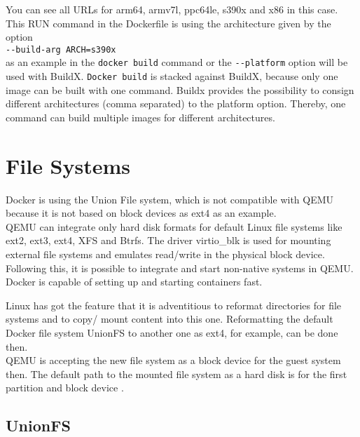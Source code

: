You can see all URLs for arm64, armv7l, ppc64le, s390x and x86 in this case. This RUN command in the Dockerfile is using the architecture given by the option \\
\lstinline!--build-arg ARCH=s390x! \\
as an example in the \lstinline!docker build! command or the \lstinline!--platform! option will be used with BuildX.
\lstinline!Docker build! is stacked against BuildX, because only one image can be built with one command.
Buildx provides the possibility to consign different architectures (comma separated) to the platform option. Thereby, one command can build multiple images for different architectures.

\section{File Systems}\label{FileSystems}

Docker is using the Union File system, which is not compatible with \gls{QEMU} because it is not based on block devices as ext4 as an example. \\
\gls{QEMU} can integrate only hard disk formats for default Linux file systems like ext2, ext3, ext4, XFS and Btrfs. 
The driver virtio\_blk is used for mounting external file systems and emulates read/write in the physical block device\cite{Barboza2018}. Following this, it is possible to integrate and start non-native systems in \gls{QEMU}. 
Docker is capable of setting up and starting containers fast. 

Linux has got the feature that it is adventitious to reformat directories for file systems and to copy/ mount content into this one. Reformatting the default Docker file system UnionFS to another one as ext4, for example, can be done then. \\
\gls{QEMU} is accepting the new file system as a block device for the guest system then. The default path to the mounted file system as a hard disk is  for the first partition and block device \cite[~p.22]{White2020}.

\subsection{UnionFS}\label{UnionFS}

